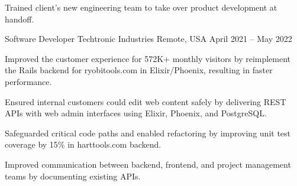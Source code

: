 \begin{cventries}
{\begin{cvitems}
			\item Trained client's new engineering team to take over product
			development at handoff.
		\end{cvitems}
	}

	\cventry
	{Software Developer} %
	{Techtronic Industries} %
	{Remote, USA} %
	{April 2021 -- May 2022} %
	{
		\begin{cvitems}
			\item Improved the customer experience for 572K+ monthly visitors by
			reimplement the Rails backend for ryobitools.com in Elixir/Phoenix,
			resulting in faster performance.
			\item Ensured internal customers could edit web content safely by
			delivering REST APIs with web admin interfaces using Elixir, Phoenix,
			and PostgreSQL.
			\item Safeguarded critical code paths and enabled refactoring by improving
			unit test coverage by 15\% in harttools.com backend.
			\item Improved communication between backend, frontend, and project
			management teams by documenting existing APIs.
		\end{cvitems}
	}



\end{cventries}
